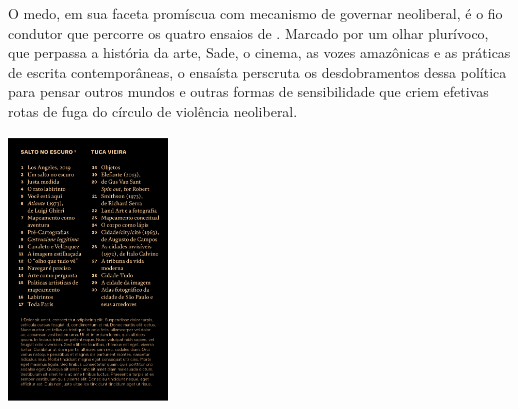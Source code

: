 \hspace*{-7cm}\hrulefill\hspace*{-7cm}


\medskip

\noindent{}O medo, em sua faceta promíscua com mecanismo de governar neoliberal, é o fio condutor que percorre os quatro ensaios de {}. Marcado por um olhar plurívoco, que perpassa a história da arte, Sade, o cinema, as vozes amazônicas e as práticas de escrita contemporâneas, o ensaísta perscruta os desdobramentos dessa política para pensar outros mundos e outras formas de sensibilidade que criem efetivas rotas de fuga do círculo de violência neoliberal.

\vfill

\hspace*{-.4cm}\begin{minipage}[c]{1\linewidth}
\small{
{}}
\end{minipage}


\pagebreak

\hspace{.5cm}

\begin{center}
\hspace*{-.5cm}\includegraphics[width=42.4mm]{./imgs/escuro.png}
\end{center}

